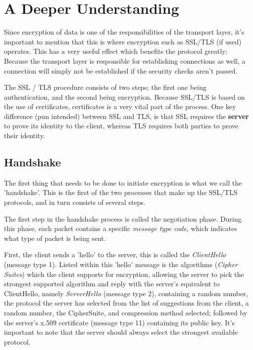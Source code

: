 \section{A Deeper Understanding} %

Since encryption of data is one of the responsibilities of the transport
layer, it's important to mention that this is where encryption such as SSL/TLS (if used) operates. This has a very useful effect which benefits the protocol greatly: Because the transport layer is responsible for establishing connections as well, a connection will simply not be established if the security checks aren't passed.

The SSL / TLS procedure consists of two steps; the first one being authentication, and the second being encryption. Because SSL/TLS is based on the use of certificates, certificates is a very vital part of the process. One key difference (pun intended) between SSL and TLS, is that SSL requires the \textbf{server }to prove its identity to the client, whereas TLS requires both parties to prove their identity. 

\subsection[Handshake]{Handshake}
The first thing that needs to be done to initiate encryption is what we
call the 'handshake'. This is the first of the two processes that make up the SSL/TLS protocols, and in turn consists of several steps. 

The first step in the handshake process is called the negotiation phase.
During this phase, each packet contains a specific \textit{message type code}, which indicates what type of packet is being sent. 

First, the client sends a 'hello' to the server, this is called the \textit{ClientHello} (message type 1).
Listed within this 'hello' message is the algorithms (\textit{Cipher Suites}) which the client supports for encryption, allowing the server to pick the strongest supported algorithm and reply with the server's equivalent to ClientHello, namely \textit{ServerHello }(message type 2), containing a random number, the protocol the server has selected from the list of suggestions from the client, a random number, the CipherSuite, and compression method selected; followed by the server's x.509 certificate (message type 11) containing its public key. It's important to note that the server should always select the strongest available protocol.

